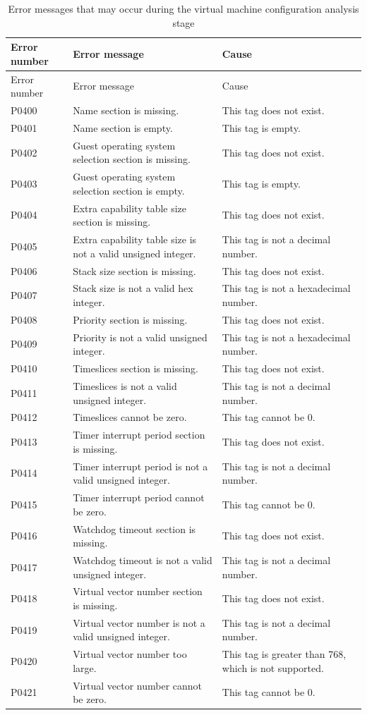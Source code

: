 \begin{xltabular}{\textwidth}{@{}>{\hsize\raggedright\arraybackslash}X>{\hsize\raggedright\arraybackslash}X>{\hsize\raggedright\arraybackslash}X@{}}
\caption{Error messages that may occur during the virtual machine configuration analysis stage}\label{tab:5-7}\\
\toprule
Error number & Error message & Cause\tabularnewline
\endfirsthead
\toprule
Error number & Error message & Cause\tabularnewline
\midrule
\endhead
\bottomrule
\endlastfoot
P0400 & Name section is missing. & This tag does not exist.\tabularnewline
P0401 & Name section is empty. & This tag is empty.\tabularnewline
P0402 & Guest operating system selection section is missing. & This tag does not exist.\tabularnewline
P0403 & Guest operating system selection section is empty. & This tag is empty.\tabularnewline
P0404 & Extra capability table size section is missing. & This tag does not exist.\tabularnewline
P0405 & Extra capability table size is not a valid unsigned integer. &
This tag is not a decimal number.\tabularnewline
P0406 & Stack size section is missing. & This tag does not exist.\tabularnewline
P0407 & Stack size is not a valid hex integer. & This tag is not a hexadecimal number.\tabularnewline
P0408 & Priority section is missing. & This tag does not exist.\tabularnewline
P0409 & Priority is not a valid unsigned integer. & This tag is not a hexadecimal number.\tabularnewline
P0410 & Timeslices section is missing. & This tag does not exist.\tabularnewline
P0411 & Timeslices is not a valid unsigned integer. & This tag is not a decimal number.\tabularnewline
P0412 & Timeslices cannot be zero. & This tag cannot be 0.\tabularnewline
P0413 & Timer interrupt period section is missing. & This tag does not exist.\tabularnewline
P0414 & Timer interrupt period is not a valid unsigned integer. & This tag is not a decimal number.\tabularnewline
P0415 & Timer interrupt period cannot be zero. & This tag cannot be 0.\tabularnewline
P0416 & Watchdog timeout section is missing. & This tag does not exist.\tabularnewline
P0417 & Watchdog timeout is not a valid unsigned integer. & This tag is not a decimal number.\tabularnewline
P0418 & Virtual vector number section is missing. & This tag does not exist.\tabularnewline
P0419 & Virtual vector number is not a valid unsigned integer. & This tag is not a decimal number.\tabularnewline
P0420 & Virtual vector number too large. & This tag is greater than 768, which is not supported.\tabularnewline
P0421 & Virtual vector number cannot be zero. & This tag cannot be 0.\tabularnewline

\end{xltabular}
